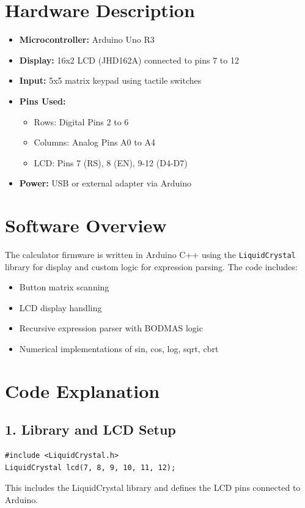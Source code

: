 \documentclass[12pt]{article}
\begin{document}
\section*{Hardware Description}
\begin{itemize}
    \item \textbf{Microcontroller:} Arduino Uno R3
    \item \textbf{Display:} 16x2 LCD (JHD162A) connected to pins 7 to 12
    \item \textbf{Input:} 5x5 matrix keypad using tactile switches
    \item \textbf{Pins Used:}
    \begin{itemize}
        \item Rows: Digital Pins 2 to 6
        \item Columns: Analog Pins A0 to A4
        \item LCD: Pins 7 (RS), 8 (EN), 9-12 (D4-D7)
    \end{itemize}
    \item \textbf{Power:} USB or external adapter via Arduino
\end{itemize}

\section*{Software Overview}
The calculator firmware is written in Arduino C++ using the \texttt{LiquidCrystal} library for display and custom logic for expression parsing. The code includes:

\begin{itemize}
    \item Button matrix scanning
    \item LCD display handling
    \item Recursive expression parser with BODMAS logic
    \item Numerical implementations of sin, cos, log, sqrt, cbrt
\end{itemize}

\section*{Code Explanation}

\subsection*{1. Library and LCD Setup}
\begin{lstlisting}
#include <LiquidCrystal.h>
LiquidCrystal lcd(7, 8, 9, 10, 11, 12);
\end{lstlisting}
This includes the LiquidCrystal library and defines the LCD pins connected to Arduino.
\end{document}
